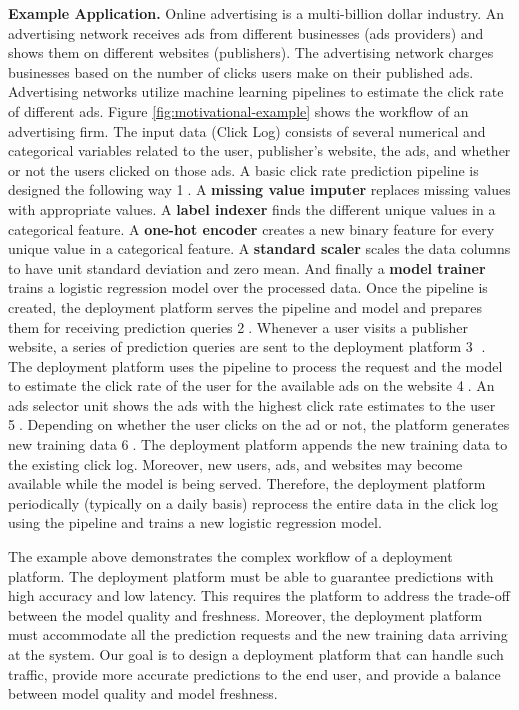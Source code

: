 \textbf{Example Application.} 
Online advertising is a multi-billion dollar industry.
An advertising network receives ads from different businesses (ads providers) and shows them on different websites (publishers).
The advertising network charges businesses based on the number of clicks users make on their published ads.
Advertising networks utilize machine learning pipelines to estimate the click rate of different ads.
Figure \ref{fig:motivational-example} shows the workflow of an advertising firm.
The input data (Click Log) consists of several numerical and categorical variables related to the user, publisher's website, the ads, and whether or not the users clicked on those ads.
A basic click rate prediction pipeline is designed the following way \textcircled{1}. 
A \textbf{missing value imputer} replaces missing values with appropriate values.
A \textbf{label indexer} finds the different unique values in a categorical feature. 
A \textbf{one-hot encoder} creates a new binary feature for every unique value in a categorical feature.
A \textbf{standard scaler} scales the data columns to have unit standard deviation and zero mean.
And finally a \textbf{model trainer} trains a logistic regression model over the processed data.
Once the pipeline is created, the deployment platform serves the pipeline and model and prepares them for receiving prediction queries \textcircled{2}.
Whenever a user visits a publisher website, a series of prediction queries are sent to the deployment platform \textcircled{3} .
The deployment platform uses the pipeline to process the request and the model to estimate the click rate of the user for the available ads on the website \textcircled{4}.
An ads selector unit shows the ads with the highest click rate estimates to the user \textcircled{5}.
Depending on whether the user clicks on the ad or not, the platform generates new training data \textcircled{6}.
The deployment platform appends the new training data to the existing click log.
Moreover, new users, ads, and websites may become available while the model is being served.
Therefore, the deployment platform periodically (typically on a daily basis) reprocess the entire data in the click log using the pipeline and trains a new logistic regression model.

The example above demonstrates the complex workflow of a deployment platform.
The deployment platform must be able to guarantee predictions with high accuracy and low latency.
This requires the platform to address the trade-off between the model quality and freshness.
Moreover, the deployment platform must accommodate all the prediction requests and the new training data arriving at the system. 
Our goal is to design a deployment platform that can handle such traffic, provide more accurate predictions to the end user, and provide a balance between model quality and model freshness.

